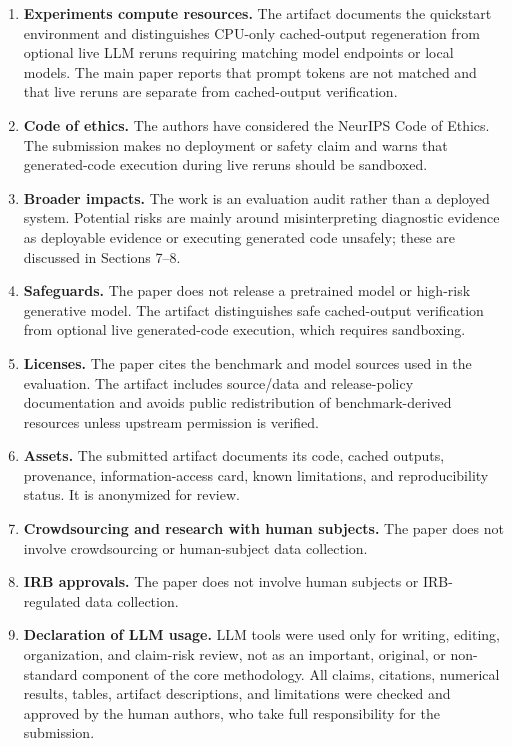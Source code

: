 \begin{enumerate}
\item \textbf{Experiments compute resources.} \answerYes{} The artifact documents the quickstart environment and distinguishes CPU-only cached-output regeneration from optional live LLM reruns requiring matching model endpoints or local models. The main paper reports that prompt tokens are not matched and that live reruns are separate from cached-output verification.

\item \textbf{Code of ethics.} \answerYes{} The authors have considered the NeurIPS Code of Ethics. The submission makes no deployment or safety claim and warns that generated-code execution during live reruns should be sandboxed.

\item \textbf{Broader impacts.} \answerYes{} The work is an evaluation audit rather than a deployed system. Potential risks are mainly around misinterpreting diagnostic evidence as deployable evidence or executing generated code unsafely; these are discussed in Sections 7--8.

\item \textbf{Safeguards.} \answerNA{} The paper does not release a pretrained model or high-risk generative model. The artifact distinguishes safe cached-output verification from optional live generated-code execution, which requires sandboxing.

\item \textbf{Licenses.} \answerYes{} The paper cites the benchmark and model sources used in the evaluation. The artifact includes source/data and release-policy documentation and avoids public redistribution of benchmark-derived resources unless upstream permission is verified.

\item \textbf{Assets.} \answerYes{} The submitted artifact documents its code, cached outputs, provenance, information-access card, known limitations, and reproducibility status. It is anonymized for review.

\item \textbf{Crowdsourcing and research with human subjects.} \answerNA{} The paper does not involve crowdsourcing or human-subject data collection.

\item \textbf{IRB approvals.} \answerNA{} The paper does not involve human subjects or IRB-regulated data collection.

\item \textbf{Declaration of LLM usage.} \answerNA{} LLM tools were used only for writing, editing, organization, and claim-risk review, not as an important, original, or non-standard component of the core methodology. All claims, citations, numerical results, tables, artifact descriptions, and limitations were checked and approved by the human authors, who take full responsibility for the submission.
\end{enumerate}
